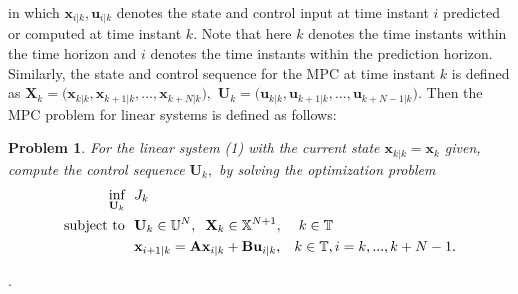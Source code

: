 \documentclass{article}
\newtheorem{problem}{Problem}
\begin{document}
in which $\textbf{x}_{i|k},\textbf{u}_{i|k}$ denotes the state and control input at time instant $i$ predicted or computed at time instant $k.$ Note that here $k$ denotes the time instants within the time horizon and $i$ denotes the time instants within the prediction horizon.
Similarly, the state and control sequence for the MPC at time instant $k$ is defined as $\textbf{X}_{k}=\big(\textbf{x}_{k|k}, \textbf{x}_{k+1|k},...,\textbf{x}_{k+{N}|k} \big),$
$\textbf{U}_{k} = \big(
\textbf{u}_{k|k}, \textbf{u}_{k+1|k},...,\textbf{u}_{k+{N}-1|k} \big).$
Then the MPC problem for linear systems is defined as follows:
\begin{problem}
For the linear system (1) with the current state $\textbf{x}_{k|k}=\textbf{x}_{k}$ given,
compute the control sequence $\textbf{U}_{k},$ by solving the optimization problem
\begin{equation}
    \begin{aligned}
    \underset{\textbf{U}_{k}}{\mbox{inf}} ~&~  J_{k}\\ 
    \text{subject to}
    ~&~ \textbf{U}_{k} \in \mathbb{U}^{N},\hspace{.2cm} \textbf{X}_{k}\in \mathbb{X}^{N+1}, \hspace{.4cm}k\in \mathbb{T}\\
    ~&~ \textbf{x}_{i+1|k}=\textbf{A}\textbf{x}_{i|k}+\textbf{B}\textbf{u}_{i|k}, \hspace{.3cm}k\in \mathbb{T}, i=k,...,k+N-1.
    \end{aligned}
\end{equation}
\end{problem}.
\newpage
\end{document}
